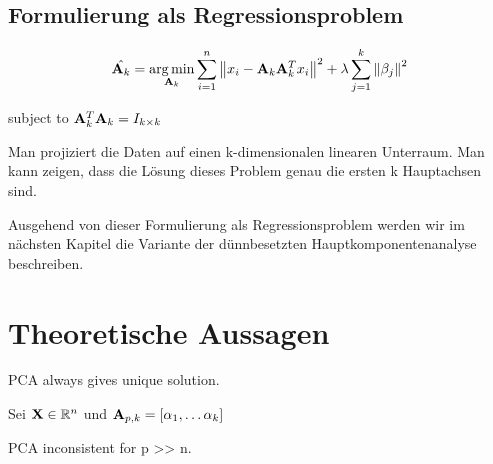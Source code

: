 \subsection{Formulierung als Regressionsproblem}
$$\hat{\mathbf{A}_k} = \operatorname*{arg\,min}_{\mathbf{A}_k} \sum_{i=1}^{n} \left\lVert x_i - \mathbf{A}_k \mathbf{A}_k^Tx_i \right\rVert^2 + \lambda \sum_{j=1}^{k}\left\lVert \beta_j \right\rVert^2$$

subject to $\mathbf{A}_k^T\mathbf{A}_k = I_{k \times k}$

\cite{zou_sparsepca}

Man projiziert die Daten auf einen k-dimensionalen linearen Unterraum. Man kann zeigen, dass die Lösung dieses Problem genau die ersten k Hauptachsen sind.

Ausgehend von dieser Formulierung als Regressionsproblem werden wir im nächsten Kapitel die Variante der dünnbesetzten Hauptkomponentenanalyse beschreiben.

\section{Theoretische Aussagen}

\begin{thm}
PCA always gives unique solution.
\end{thm}

\begin{thm}
Sei $\mathbf{X} \in \mathbb{R}^n$ und $\mathbf{A}_{p,k} = [\alpha_1, \ldots \alpha_k] $   
\end{thm}

\begin{thm}
PCA inconsistent for p >> n.
\end{thm}

